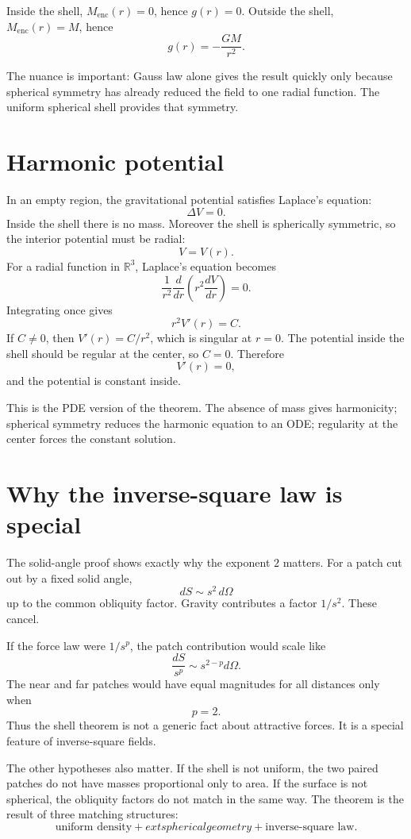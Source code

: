 Inside the shell, \(M_{\mathrm{enc}}(r)=0\), hence \(g(r)=0\).  Outside the shell, \(M_{\mathrm{enc}}(r)=M\), hence
\[
  g(r)=-\frac{GM}{r^2}.
\]

The nuance is important: Gauss law alone gives the result quickly only because spherical symmetry has already reduced the field to one radial function.  The uniform spherical shell provides that symmetry.

\section{Harmonic potential}

In an empty region, the gravitational potential satisfies Laplace's equation:
\[
  \Delta V=0.
\]
Inside the shell there is no mass.  Moreover the shell is spherically symmetric, so the interior potential must be radial:
\[
  V=V(r).
\]
For a radial function in \(\mathbb R^3\), Laplace's equation becomes
\[
  \frac1{r^2}\frac{d}{dr}\left(r^2\frac{dV}{dr}\right)=0.
\]
Integrating once gives
\[
  r^2V'(r)=C.
\]
If \(C\ne0\), then \(V'(r)=C/r^2\), which is singular at \(r=0\).  The potential inside the shell should be regular at the center, so \(C=0\).  Therefore
\[
  V'(r)=0,
\]
and the potential is constant inside.

This is the PDE version of the theorem.  The absence of mass gives harmonicity; spherical symmetry reduces the harmonic equation to an ODE; regularity at the center forces the constant solution.

\section{Why the inverse-square law is special}

The solid-angle proof shows exactly why the exponent \(2\) matters.  For a patch cut out by a fixed solid angle,
\[
  dS\sim s^2\,d\Omega
\]
up to the common obliquity factor.  Gravity contributes a factor \(1/s^2\).  These cancel.

If the force law were \(1/s^p\), the patch contribution would scale like
\[
  \frac{dS}{s^p}\sim s^{2-p}d\Omega.
\]
The near and far patches would have equal magnitudes for all distances only when
\[
  p=2.
\]
Thus the shell theorem is not a generic fact about attractive forces.  It is a special feature of inverse-square fields.

The other hypotheses also matter.  If the shell is not uniform, the two paired patches do not have masses proportional only to area.  If the surface is not spherical, the obliquity factors do not match in the same way.  The theorem is the result of three matching structures:
\[
  \text{uniform density}+	ext{spherical geometry}+\text{inverse-square law}.
\]

